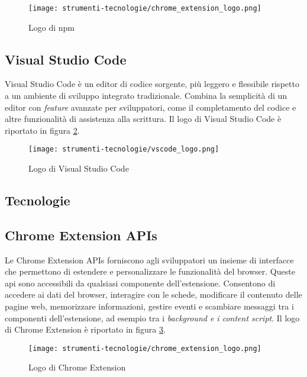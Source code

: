 \begin{figure}[H]
  \centering 
  \texttt{[image: strumenti-tecnologie/chrome\_extension\_logo.png]} 
  \caption{Logo di npm}
  \label{fig:logo_npm} 
\end{figure}

\subsection*{Visual Studio Code}

\par Visual Studio Code è un editor di codice sorgente, più leggero e flessibile rispetto a un ambiente di sviluppo integrato tradizionale. Combina la semplicità di un editor con \textit{feature} avanzate per sviluppatori, come il completamento del codice e altre funzionalità di assistenza alla scrittura. Il logo di Visual Studio Code è riportato in figura \ref{fig:logo_vscode}.

\begin{figure}[H]
  \centering 
  \texttt{[image: strumenti-tecnologie/vscode\_logo.png]} 
  \caption{Logo di Visual Studio Code}
  \label{fig:logo_vscode} 
\end{figure}

\subsection{Tecnologie}

\subsection*{Chrome Extension APIs}

\par Le Chrome Extension APIs forniscono agli sviluppatori un insieme di interfacce che permettono di estendere e personalizzare le funzionalità del browser. Queste \gls{api} sono accessibili da qualsiasi componente dell’estensione. Consentono di accedere ai dati del browser, interagire con le schede, modificare il contenuto delle pagine web, memorizzare informazioni, gestire eventi e scambiare messaggi tra i componenti dell’estensione, ad esempio tra i \textit{background e i content script}. Il logo di Chrome Extension è riportato in figura \ref{fig:logo_chrome_extension}.

\begin{figure}[H]
  \centering 
  \texttt{[image: strumenti-tecnologie/chrome\_extension\_logo.png]} 
  \caption{Logo di Chrome Extension}
  \label{fig:logo_chrome_extension} 
\end{figure}

